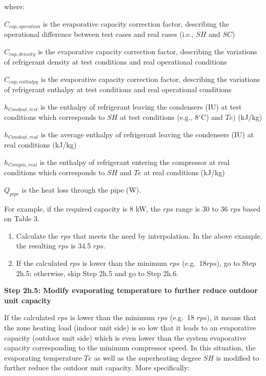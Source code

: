 where:

\(C_{cap,operation}\) is the evaporative capacity correction factor, describing the operational difference between test cases and real cases (i.e., \(SH\) and \(SC\))

\(C_{cap,density}\) is the evaporative capacity correction factor, describing the variations of refrigerant density at test conditions and real operational conditions

\(C_{cap,enthalpy}\) is the evaporative capacity correction factor, describing the variations of refrigerant enthalpy at test conditions and real operational conditions

\(h_{Condout,test}\) is the enthalpy of refrigerant leaving the condensers (IU) at test conditions which corresponds to \(SH\) at test conditions (e.g., 8\(^{\circ}\)C) and \(Te\)) (kJ/kg)

\(h_{Condout,real}\) is the average enthalpy of refrigerant leaving the condensers (IU) at real conditions (kJ/kg)

\(h_{Compin,real}\) is the enthalpy of refrigerant entering the compressor at real conditions which corresponds to \(SH\) and \(Te\) at real conditions (kJ/kg)

\(Q_{pipe}\) is the heat loss through the pipe (W).

For example, if the required capacity is 8 kW, the \(rps\) range is 30 to 36 \(rps\) based on Table 3.

\begin{enumerate}
\def\labelenumi{\alph{enumi}.}
\setcounter{enumi}{2}
\item
  Calculate the \(rps\) that meets the need by interpolation. In the above example, the resulting \(rps\) is 34.5 \(rps\).
\item
  If the calculated \(rps\) is lower than the minimum \(rps\) (e.g.~18\(rps\)), go to Step 2h.5; otherwise, skip Step 2h.5 and go to Step 2h.6.
\end{enumerate}

\textbf{Step 2h.5: Modify evaporating temperature to further reduce outdoor unit capacity}

If the calculated \(rps\) is lower than the minimum \(rps\) (e.g.~18 \(rps\)), it means that the zone heating load (indoor unit side) is so low that it leads to an evaporative capacity (outdoor unit side) which is even lower than the system evaporative capacity corresponding to the minimum compressor speed. In this situation, the evaporating temperature \(Te\) as well as the superheating degree \(SH\) is modified to further reduce the outdoor unit capacity. More specifically:

